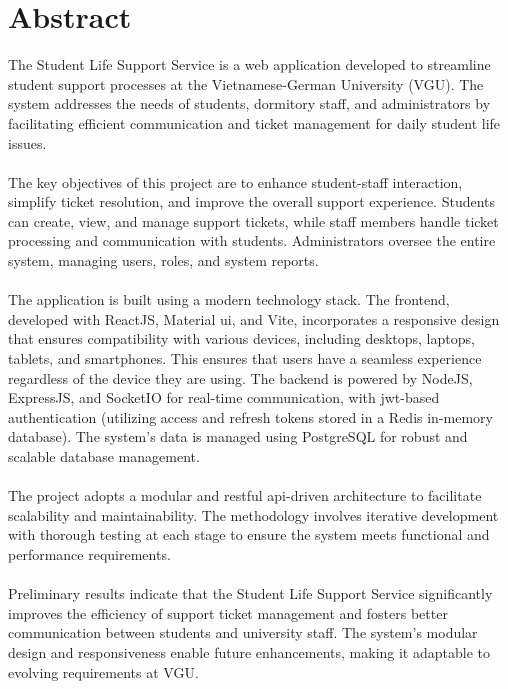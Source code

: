 \section*{Abstract}

The Student Life Support Service is a web application developed to streamline student support processes at the Vietnamese-German University (VGU). The system addresses the needs of students, dormitory staff, and administrators by facilitating efficient communication and ticket management for daily student life issues. \\ \\
The key objectives of this project are to enhance student-staff interaction, simplify ticket resolution, and improve the overall support experience. Students can create, view, and manage support tickets, while staff members handle ticket processing and communication with students. Administrators oversee the entire system, managing users, roles, and system reports. \\ \\
The application is built using a modern technology stack. The frontend, developed with ReactJS, Material \acs{ui}, and Vite, incorporates a responsive design that ensures compatibility with various devices, including desktops, laptops, tablets, and smartphones. This ensures that users have a seamless experience regardless of the device they are using. The backend is powered by NodeJS, ExpressJS, and SocketIO for real-time communication, with \acs{jwt}-based authentication (utilizing access and refresh tokens stored in a Redis in-memory database). The system's data is managed using PostgreSQL for robust and scalable database management. \\ \\
The project adopts a modular and \acs{rest}ful \acs{api}-driven architecture to facilitate scalability and maintainability. The methodology involves iterative development with thorough testing at each stage to ensure the system meets functional and performance requirements. \\ \\
Preliminary results indicate that the Student Life Support Service significantly improves the efficiency of support ticket management and fosters better communication between students and university staff. The system's modular design and responsiveness enable future enhancements, making it adaptable to evolving requirements at VGU.
